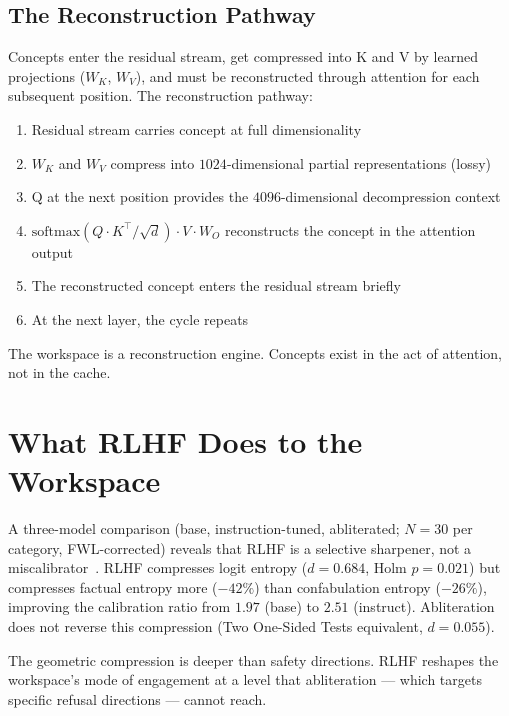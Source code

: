 \documentclass[11pt,a4paper]{article}
\begin{document}
\subsection{The Reconstruction Pathway}

Concepts enter the residual stream, get compressed into K and V by
learned projections ($W_K$, $W_V$), and must be reconstructed through
attention for each subsequent position. The reconstruction pathway:
\begin{enumerate}[nosep]
\item Residual stream carries concept at full dimensionality
\item $W_K$ and $W_V$ compress into $1024$-dimensional partial
  representations (lossy)
\item Q at the next position provides the $4096$-dimensional
  decompression context
\item $\text{softmax}(Q \cdot K^\top / \sqrt{d}) \cdot V \cdot W_O$
  reconstructs the concept in the attention output
\item The reconstructed concept enters the residual stream briefly
\item At the next layer, the cycle repeats
\end{enumerate}

The workspace is a reconstruction engine. Concepts exist in the act
of attention, not in the cache.

\section{What RLHF Does to the Workspace}
\label{sec:rlhf}

A three-model comparison (base, instruction-tuned, abliterated;
$N{=}30$ per category, FWL-corrected) reveals that RLHF is a
selective sharpener, not a miscalibrator~\citep{lyra2026mine5}.
RLHF compresses logit entropy ($d{=}0.684$, Holm $p{=}0.021$) but
compresses factual entropy more ($-42\%$) than confabulation entropy
($-26\%$), improving the calibration ratio from $1.97$ (base) to
$2.51$ (instruct). Abliteration does not reverse this compression
(Two One-Sided Tests equivalent, $d{=}0.055$).

The geometric compression is deeper than safety directions. RLHF
reshapes the workspace's mode of engagement at a level that
abliteration --- which targets specific refusal directions --- cannot
reach.

\end{document}
